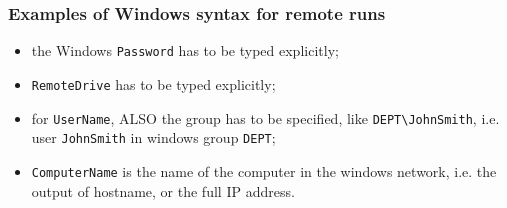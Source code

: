 \documentclass[12pt,a4paper,pdftex]{article}
\begin{document}
\subsubsection{Examples of Windows syntax for remote runs}
\begin{itemize}
\item the Windows \verb"Password" has to be typed explicitly;
\item \verb"RemoteDrive" has to be typed explicitly;
\item for \verb"UserName", ALSO the group has to be specified, like \verb"DEPT\JohnSmith", i.e. user \verb"JohnSmith" in windows group \verb"DEPT";
\item \verb"ComputerName" is the name of the computer in the windows network, i.e. the output of hostname, or the full IP address.
\end{itemize}
\end{document}
